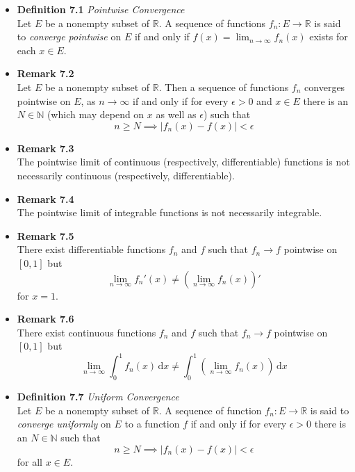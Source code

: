 \documentclass[11pt,a4paper]{article}
\begin{document}
\begin{itemize}
    \item \textbf{Definition 7.1} \emph{Pointwise Convergence} \\
        Let $E$ be a nonempty subset of $\mathbb{R}$.
        A sequence of functions $f_n : E \to \mathbb{R}$ is said to \emph{converge pointwise}
        on $E$ if and only if $f(x) = \lim_{n \to \infty} f_n(x)$ exists for each $x \in E$.

    \item \textbf{Remark 7.2} \\
        Let $E$ be a nonempty subset of $\mathbb{R}$.
        Then a sequence of functions $f_n$ converges pointwise on $E$, as $n \to \infty$
        if and only if for every $\epsilon > 0$ and $x \in E$ there is an $N \in \mathbb{N}$
        (which may depend on $x$ as well as $\epsilon$) such that
        \[
            n \geq N \implies |f_n(x) - f(x)| < \epsilon
        \]

    \item \textbf{Remark 7.3} \\
        The pointwise limit of continuous (respectively, differentiable) functions is not
        necessarily continuous (respectively, differentiable).

    \item \textbf{Remark 7.4} \\
        The pointwise limit of integrable functions is not necessarily integrable.

    \item \textbf{Remark 7.5} \\
        There exist differentiable functions $f_n$ and $f$ such that $f_n \to f$ pointwise
        on $[0, 1]$ but
        \[
            \lim_{n \to \infty} f_n'(x) \neq \left( \lim_{n \to \infty} f_n(x) \right)'
        \]
        for $x = 1$.

    \item \textbf{Remark 7.6} \\
        There exist continuous functions $f_n$ and $f$ such that $f_n \to f$ pointwise on
        $[0, 1]$ but
        \[
            \lim_{n \to \infty} \int_0^1 f_n(x) \, \mathrm{d}x \neq
            \int_0^1 \left( \lim_{n \to \infty} f_n(x) \right) \, \mathrm{d}x
        \]

    \item \textbf{Definition 7.7} \emph{Uniform Convergence} \\
        Let $E$ be a nonempty subset of $\mathbb{R}$.
        A sequence of function $f_n : E \to \mathbb{R}$ is said to \emph{converge uniformly}
        on $E$ to a function $f$ if and only if for every $\epsilon > 0$ there is an
        $N \in \mathbb{N}$ such that
        \[
            n \geq N \implies |f_n(x) - f(x)| < \epsilon
        \]
        for all $x \in E$.


\end{itemize}
\end{document}
